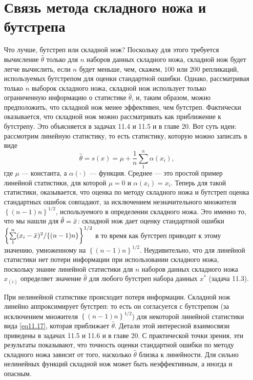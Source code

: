\section{Связь метода складного ножа и бутстрепа}

Что лучше, бутстреп или складной нож? Поскольку для этого требуется вычисление $\hat{\theta}$ только для $n$ наборов данных складного ножа, складной нож будет легче вычислить, если $n$ будет меньше, чем, скажем, $100$ или $200$ репликаций, используемых бутстрепом для оценки стандартной ошибки. Однако, рассматривая только $n$ выборок складного ножа, складной нож использует только ограниченную информацию о статистике $\hat{\theta}$, и, таким образом, можно предположить, что складной нож менее эффективен, чем бутстреп. Фактически оказывается, что складной нож можно рассматривать как приближение к бутстрепу. Это объясняется в задачах 11.4 и 11.5 и в главе 20. Вот суть идеи: рассмотрим линейную статистику, то есть статистику, которую можно записать в виде
\begin{equation}\label{eq11.17}
    \hat{\theta} = s(x) = \mu + \frac{1}{n}\sum\limits_{1}^{n}\alpha(x_{i}),
\end{equation}
где $\mu$ --- константа, а $\alpha(\cdot)$ --- функция. Среднее --- это простой пример линейной статистики, для которой $\mu = 0$ и $\alpha(x_i) = x_i$. Теперь для такой статистики, оказывается, что оценка по методу складного ножа и бутстреп оценка стандартных ошибок совпадают, за исключением незначительного множителя $\left\{(n-1)n\right\}^{1/2}$, используемого в определении складного ножа. Это именно то, что мы нашли для $\hat{\theta} = \Bar{x}$: складной нож дает оценку стандартной ошибки $\left\{\sum\limits_{1}^{n}(x_{i} - \Bar{x})^2/\{(n-1)n\}\right\}^{1/2}$ в то время как бутстреп приводит к этому значению, умноженному на $\left\{(n-1)n\right\}^{1/2}$. Неудивительно, что для линейной статистики нет потери информации при использовании складного ножа, поскольку знание линейной статистики для $n$ наборов данных складного ножа $x_{(i)}$ определяет значение $\hat{\theta}$ для любого бутстреп набора данных $x^{*}$ (задача 11.3).

При нелинейной статистике происходит потеря информации. Складной нож линейно аппроксимирует бутстреп: то есть он согласуется с бутстрепом (за исключением множителя $\left\{(n-1)n\right\}^{1/2}$) для некоторой линейной статистики вида \ref{eq11.17}, которая приближает $\hat{\theta}$. Детали этой интересной взаимосвязи приведены в задачах 11.5 и 11.6 и в главе 20. С практической точки зрения, эти результаты показывают, что точность оценки стандартной ошибки по методу складного ножа зависит от того, насколько $\hat{\theta}$ близка к линейности. Для сильно нелинейных функций складной нож может быть неэффективным, а иногда и опасным.

